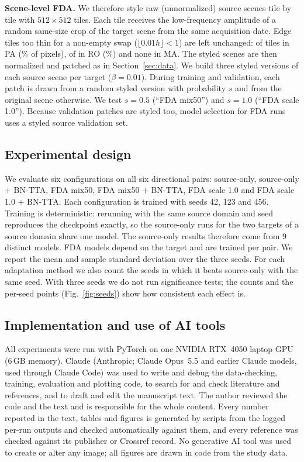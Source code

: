 \documentclass[11pt]{article}
\newcommand{\BNTTA}{BN-TTA}
\begin{document}
\textbf{Scene-level FDA.}
We therefore style raw (unnormalized) source scenes tile by tile with $512\times512$ tiles.
Each tile receives the low-frequency amplitude of a random same-size crop of the target scene from the same acquisition date.
Edge tiles too thin for a non-empty swap ($\lfloor0.01h\rfloor<1$) are left unchanged: \FDAUnstyledPA{} of \FDATilesPA{} tiles in PA (\FDAUnstyledPctPA\% of pixels), \FDAUnstyledRO{} of \FDATilesRO{} in RO (\FDAUnstyledPctRO\%) and none in MA.
The styled scenes are then normalized and patched as in Section~\ref{sec:data}.
We build three styled versions of each source scene per target ($\beta=0.01$).
During training and validation, each patch is drawn from a random styled version with probability $s$ and from the original scene otherwise.
We test $s=0.5$ (``FDA mix50'') and $s=1.0$ (``FDA scale 1.0'').
Because validation patches are styled too, model selection for FDA runs uses a styled source validation set.

\subsection{Experimental design}



We evaluate six configurations on all six directional pairs: source-only, source-only + \BNTTA{}, FDA mix50, FDA mix50 + \BNTTA{}, FDA scale 1.0 and FDA scale 1.0 + \BNTTA{}.
Each configuration is trained with seeds 42, 123 and 456.
Training is deterministic: rerunning with the same source domain and seed reproduces the checkpoint exactly, so the source-only runs for the two targets of a source domain share one model.
The source-only results therefore come from 9 distinct models.
FDA models depend on the target and are trained per pair.
We report the mean and sample standard deviation over the three seeds.
For each adaptation method we also count the seeds in which it beats source-only with the same seed.
With three seeds we do not run significance tests; the counts and the per-seed points (Fig.~\ref{fig:seeds}) show how consistent each effect is.

\subsection{Implementation and use of AI tools}\label{sec:impl}

All experiments were run with PyTorch on one NVIDIA RTX~4050 laptop GPU (6\,GB memory).
Claude (Anthropic; Claude Opus~5.5 and earlier Claude models, used through Claude Code) was used to write and debug the data-checking, training, evaluation and plotting code, to search for and check literature and references, and to draft and edit the manuscript text.
The author reviewed the code and the text and is responsible for the whole content.
Every number reported in the text, tables and figures is generated by scripts from the logged per-run outputs and checked automatically against them, and every reference was checked against its publisher or Crossref record.
No generative AI tool was used to create or alter any image; all figures are drawn in code from the study data.
\end{document}
